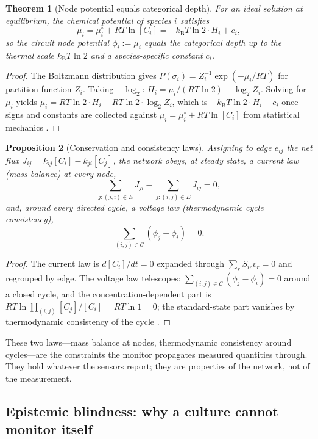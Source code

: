 \documentclass[11pt,twocolumn,a4paper]{article}
\theoremstyle{thmstyle}
\newtheorem{theorem}{Theorem}[section]
\newtheorem{proposition}[theorem]{Proposition}
\theoremstyle{definition}
\theoremstyle{remark}
\newcommand{\kB}{k_{\mathrm{B}}}
\newcommand{\E}{E}
\newcommand{\Hcat}{H}
\begin{document}
\begin{theorem}[Node potential equals categorical depth]
\label{thm:mu-depth}
For an ideal solution at equilibrium, the chemical potential of species
$i$ satisfies
\[
\mu_i=\mu_i^\circ+RT\ln[C_i]=-\kB T\ln 2\cdot\Hcat_i+c_i,
\]
so the circuit node potential $\phi_i:=\mu_i$ equals the categorical depth
up to the thermal scale $\kB T\ln2$ and a species-specific constant $c_i$.
\end{theorem}

\begin{proof}
The Boltzmann distribution gives
$P(\sigma_i)=Z_i^{-1}\exp(-\mu_i/RT)$ for partition function $Z_i$. Taking
$-\log_2$: $\Hcat_i=\mu_i/(RT\ln2)+\log_2 Z_i$. Solving for $\mu_i$ yields
$\mu_i=RT\ln2\cdot\Hcat_i-RT\ln2\cdot\log_2 Z_i$, which is
$-\kB T\ln2\cdot\Hcat_i+c_i$ once signs and constants are collected against
$\mu_i=\mu_i^\circ+RT\ln[C_i]$ from statistical mechanics
\citep{jaynes1957information,atkins2018physical}.
\end{proof}

\begin{proposition}[Conservation and consistency laws]
\label{prop:kirchhoff}
Assigning to edge $e_{ij}$ the net flux $J_{ij}=k_{ij}[C_i]-k_{ji}[C_j]$,
the network obeys, at steady state, a current law (mass balance) at every
node,
\[
\sum_{j:(j,i)\in\E}J_{ji}-\sum_{j:(i,j)\in\E}J_{ij}=0,
\]
and, around every directed cycle, a voltage law (thermodynamic cycle
consistency),
\[
\sum_{(i,j)\in\mathcal{C}}(\phi_j-\phi_i)=0.
\]
\end{proposition}

\begin{proof}
The current law is $d[C_i]/dt=0$ expanded through
$\sum_r S_{ir}v_r=0$ and regrouped by edge. The voltage law telescopes:
$\sum_{(i,j)\in\mathcal{C}}(\phi_j-\phi_i)=0$ around a closed cycle, and the
concentration-dependent part is $RT\ln\prod_{(i,j)}[C_j]/[C_i]=RT\ln1=0$;
the standard-state part vanishes by thermodynamic consistency of the cycle
\citep{heinrich1996regulation,klipp2016systems}.
\end{proof}

These two laws---mass balance at nodes, thermodynamic consistency around
cycles---are the constraints the monitor propagates measured quantities
through. They hold whatever the sensors report; they are properties of the
network, not of the measurement.

\subsection{Epistemic blindness: why a culture cannot monitor itself}
\end{document}
